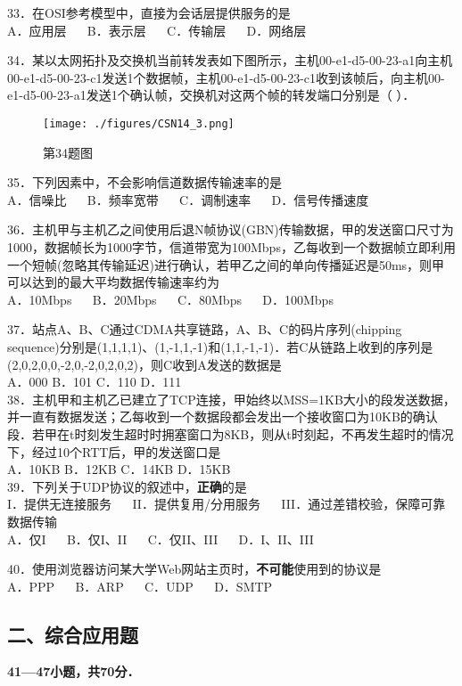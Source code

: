 33．在OSI参考模型中，直接为会话层提供服务的是 \\
A．应用层 $\quad$ B．表示层  $\quad$ C．传输层 $\quad$ D．网络层

34．某以太网拓扑及交换机当前转发表如下图所示，主机00-e1-d5-00-23-a1向主机00-e1-d5-00-23-c1发送1个数据帧，主机00-e1-d5-00-23-c1收到该帧后，向主机00-e1-d5-00-23-a1发送1个确认帧，交换机对这两个帧的转发端口分别是（ ）．
\begin{figure}[ht]
\centering
\texttt{[image: ./figures/CSN14\_3.png]}
\caption{第34题图} \label{CSN14_fig3}
\end{figure}

35．下列因素中，不会影响信道数据传输速率的是 \\
A．信噪比 $\quad$ B．频率宽带 $\quad$ C．调制速率 $\quad$ D．信号传播速度

36．主机甲与主机乙之间使用后退N帧协议(GBN)传输数据，甲的发送窗口尺寸为1000，数据帧长为1000字节，信道带宽为100Mbps，乙每收到一个数据帧立即利用一个短帧(忽略其传输延迟)进行确认，若甲乙之间的单向传播延迟是50ms，则甲可以达到的最大平均数据传输速率约为 \\
A．10Mbps $\quad$ B．20Mbps $\quad$ C．80Mbps $\quad$ D．100Mbps

37．站点A、B、C通过CDMA共享链路，A、B、C的码片序列(chipping sequence)分别是(1,1,1,1)、(1,-1,1,-1)和(1,1,-1,-1)．若C从链路上收到的序列是(2,0,2,0,0,-2,0,-2,0,2,0,2)，则C收到A发送的数据是 \\
A．000 B．101 C．110 D．111 \\

38．主机甲和主机乙已建立了TCP连接，甲始终以MSS=1KB大小的段发送数据，并一直有数据发送；乙每收到一个数据段都会发出一个接收窗口为10KB的确认段．若甲在t时刻发生超时时拥塞窗口为8KB，则从t时刻起，不再发生超时的情况下，经过10个RTT后，甲的发送窗口是 \\
A．10KB B．12KB C．14KB D．15KB \\

39．下列关于UDP协议的叙述中，\textbf{正确}的是 \\
I．提供无连接服务 $\quad$ II．提供复用/分用服务 $\quad$ III．通过差错校验，保障可靠数据传输 \\
A．仅I $\quad$ B．仅I、II $\quad$ C．仅II、III $\quad$ D．I、II、III

40．使用浏览器访问某大学Web网站主页时，\textbf{不可能}使用到的协议是 \\
A．PPP $\quad$ B．ARP $\quad$ C．UDP $\quad$ D．SMTP

\subsection{二、综合应用题}
\textbf{41—47小题，共70分．}

